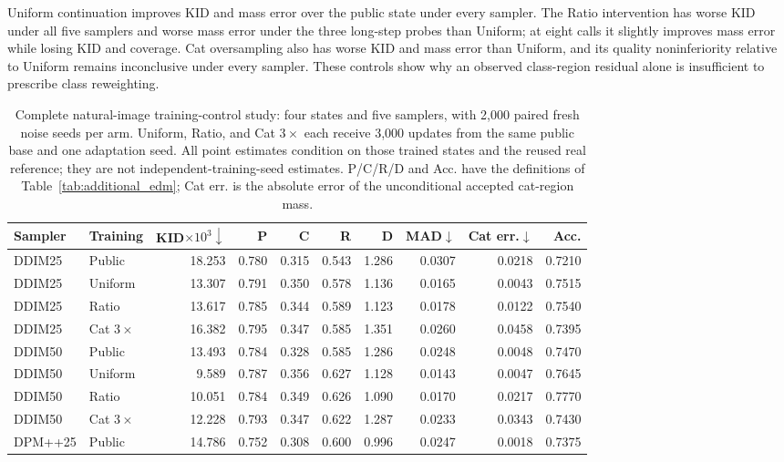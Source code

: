 Uniform continuation improves KID and mass error over the public state
under every sampler. The Ratio intervention has worse KID under all five
samplers and worse mass error under the three long-step probes than
Uniform; at eight calls it slightly improves mass error while losing KID
and coverage. Cat oversampling also has worse KID and mass error than
Uniform, and its quality noninferiority relative to Uniform remains
inconclusive under every sampler. These controls show why an observed
class-region residual alone is insufficient to prescribe class reweighting.

\begin{table}[t]
\centering\small
\setlength{\tabcolsep}{4pt}
\caption{Complete natural-image training-control study: four states and five samplers, with 2,000 paired fresh noise seeds per arm. Uniform, Ratio, and Cat $3\times$ each receive 3,000 updates from the same public base and one adaptation seed. All point estimates condition on those trained states and the reused real reference; they are not independent-training-seed estimates. P/C/R/D and Acc. have the definitions of Table~\ref{tab:additional_edm}; Cat err. is the absolute error of the unconditional accepted cat-region mass.}
\label{tab:additional_training}
\begin{tabular}{llrrrrrrrr}
\toprule
Sampler & Training & KID$\times10^3\downarrow$ & P & C & R & D & MAD$\downarrow$ & Cat err.$\downarrow$ & Acc. \\
\midrule
DDIM25 & Public & 18.253 & 0.780 & 0.315 & 0.543 & 1.286 & 0.0307 & 0.0218 & 0.7210 \\
DDIM25 & Uniform & 13.307 & 0.791 & 0.350 & 0.578 & 1.136 & 0.0165 & 0.0043 & 0.7515 \\
DDIM25 & Ratio & 13.617 & 0.785 & 0.344 & 0.589 & 1.123 & 0.0178 & 0.0122 & 0.7540 \\
DDIM25 & Cat $3\times$ & 16.382 & 0.795 & 0.347 & 0.585 & 1.351 & 0.0260 & 0.0458 & 0.7395 \\
\midrule
DDIM50 & Public & 13.493 & 0.784 & 0.328 & 0.585 & 1.286 & 0.0248 & 0.0048 & 0.7470 \\
DDIM50 & Uniform & 9.589 & 0.787 & 0.356 & 0.627 & 1.128 & 0.0143 & 0.0047 & 0.7645 \\
DDIM50 & Ratio & 10.051 & 0.784 & 0.349 & 0.626 & 1.090 & 0.0170 & 0.0217 & 0.7770 \\
DDIM50 & Cat $3\times$ & 12.228 & 0.793 & 0.347 & 0.622 & 1.287 & 0.0233 & 0.0343 & 0.7430 \\
\midrule
DPM++25 & Public & 14.786 & 0.752 & 0.308 & 0.600 & 0.996 & 0.0247 & 0.0018 & 0.7375 \\

\end{tabular}
\end{table}
